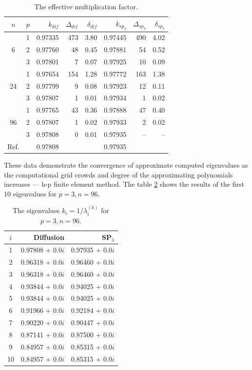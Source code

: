 \documentclass[authoryear]{elsarticle}
\begin{document}
\begin{table}[h]
\caption{The effective multiplication factor.}
\label{tab:iaea_without_lambda}
\begin{center}
\begin{tabular}{c r r r r r r r}
\hline
$n$ & $p$ & $k_{dif}$ & $\Delta_{dif}$ & $\delta_{dif}$ &$k_{sp_3}$& $\Delta_{sp_3}$ & $\delta_{sp_3}$ \\
\hline
	& 1	& 0.97335& 473& 3.80& 0.97445& 490&  4.02\\
6	& 2	& 0.97760&  48& 0.45& 0.97881&  54&  0.52\\
	& 3	& 0.97801&   7& 0.07& 0.97925&  10&  0.09\\
\hline
	& 1	& 0.97654& 154& 1.28& 0.97772& 163& 1.38\\
24& 2	& 0.97799&   9& 0.08& 0.97923&  12& 0.11\\
	& 3	& 0.97807&   1& 0.01& 0.97934&   1& 0.02\\ 
\hline
	& 1	& 0.97765&  43& 0.36& 0.97888&  47& 0.40\\
96& 2	& 0.97807&   1& 0.02& 0.97933&   2& 0.02\\
	& 3	& 0.97808&   0& 0.01& 0.97935&  --& --\\ 
\hline
Ref.&   & 0.97808&    &     & 0.97935&    &\\ 
\hline
\end{tabular}
\end{center}
\end{table}

These data demonstrate the convergence of approximate computed eigenvalues as the computational grid crowds and degree of the approximating polynomials increases --- h-p finite element method.
The table \ref{tab:iaea_without_lambda_10} shows the results of the first 10 eigenvalues for $ p = 3, n = 96 $.

\begin{table}[h]
\caption{The eigenvalues $k_i=1/\lambda_i^{(k)}$ for $p=3, n=96$.}
\label{tab:iaea_without_lambda_10}
\begin{center}
\begin{tabular}{c r r}
\hline
$i$ & Diffusion & SP$_3$  \\
\hline
1 & 0.97808 + 0.0$i$ & 0.97935 + 0.0$i$\\
2 & 0.96318 + 0.0$i$ & 0.96460 + 0.0$i$\\
3 & 0.96318 + 0.0$i$ & 0.96460 + 0.0$i$\\
4 & 0.93844 + 0.0$i$ & 0.94025 + 0.0$i$\\
5 & 0.93844 + 0.0$i$ & 0.94025 + 0.0$i$\\
6 & 0.91966 + 0.0$i$ & 0.92184 + 0.0$i$\\
7 & 0.90220 + 0.0$i$ & 0.90447 + 0.0$i$\\
8 & 0.87141 + 0.0$i$ & 0.87500 + 0.0$i$\\
9 & 0.84957 + 0.0$i$ & 0.85315 + 0.0$i$\\
10 & 0.84957 + 0.0$i$ & 0.85315 + 0.0$i$\\
\hline
\end{tabular}
\end{center}
\end{table}
\end{document}
